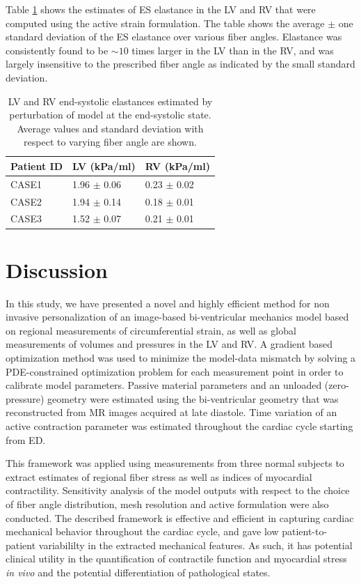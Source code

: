 Table \ref{paper3:tab:elastance} shows the estimates of ES elastance in the
LV and RV that were computed using the active strain formulation. 
The table shows the average $\pm$ one standard deviation of the ES
elastance over various fiber angles. Elastance was consistently
found to be $\sim 10$ times larger in the LV than in the RV, and was 
largely insensitive to the prescribed fiber angle as indicated by the
small standard deviation.  

\begin{table}
  \centering
\caption{LV and RV end-systolic elastances estimated
  by perturbation of model at the end-systolic state. Average values and
  standard deviation with respect to varying fiber angle are shown.}
\begin{tabular}{lll}
\toprule
 Patient ID   & LV (kPa/ml)     & RV (kPa/ml)     \\
\midrule
 CASE1        & 1.96 $\pm$ 0.06 & 0.23 $\pm$ 0.02 \\
 CASE2        & 1.94 $\pm$ 0.14 & 0.18 $\pm$ 0.01 \\
 CASE3        & 1.52 $\pm$ 0.07 & 0.21 $\pm$ 0.01 \\
\bottomrule
\end{tabular}
\label{paper3:tab:elastance}
\end{table}


\section{Discussion}
\label{paper3:sec:disc}
In this study, we have presented a novel and highly efficient method for non invasive
personalization of an image-based bi-ventricular mechanics model based
on regional measurements of circumferential strain, as well as global
measurements of volumes and pressures in the LV and RV.
A gradient based optimization method was used to
minimize the model-data mismatch by solving a PDE-constrained optimization problem for
each measurement point in order to calibrate model
parameters. Passive material parameters and an unloaded
(zero-pressure) geometry were estimated using the bi-ventricular
geometry that was reconstructed from MR images acquired at late
diastole. Time variation of an active contraction parameter was
estimated throughout the cardiac cycle starting from ED. 

This framework was applied using measurements from three normal subjects to
extract estimates of regional fiber stress as well as indices of myocardial
contractility.  Sensitivity analysis of the model outputs with respect
to the choice of fiber angle distribution, mesh resolution and active
formulation were also conducted. The described framework is
effective and efficient in capturing cardiac mechanical behavior
throughout the cardiac cycle, and gave low patient-to-patient variabililty in the extracted mechanical features.  As such, it has potential clinical utility in
the quantification of contractile function and myocardial stress
{\it in vivo} and the potential differentiation of pathological states.



